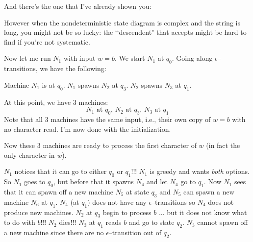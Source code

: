 And there's the one that I've already shown you:
\begin{center}
\end{center}


However when the nondeterministic state diagram is complex and the string is 
long, you might not be so lucky: the \lq\lq descendent"
that accepts
might be hard to find if you're not systematic.


Now let me run $N_1$ with input $w = b$. 
We start $N_1$ at $q_0$.
Going along $\epsilon$--transitions, we have the following:
\begin{enumerate}
\li Machine $N_1$ is at $q_0$. 
\li $N_1$ spawns $N_2$ at $q_3$. 
\li $N_2$ spawns $N_3$ at $q_1$.
\end{enumerate}
At this point, we have 3 machines:
\[
\text{$N_1$ at $q_0$, $N_2$ at $q_3$, $N_3$ at $q_1$}
\]
Note that all 3 machines have the same input, i.e., their own copy of 
$w = b$ with no character read.
I'm now done with the initialization.

Now these 3 machines are ready to process the first character of $w$ 
(in fact the only character in $w$).
\begin{enumerate}
  \li 
  $N_1$ notices that it can go to either $q_0$ or $q_1$!!! 
  $N_1$ is greedy and wants \textit{both} options.
  So $N_1$ goes to $q_0$, 
  but before that it spawns $N_4$ and let $N_4$ go to $q_1$. 
  Now $N_1$ sees that it can spawn off a new machine $N_5$ 
  at state $q_3$ and $N_5$ can spawn a new machine $N_6$ at $q_1$.
  $N_4$ (at $q_1$) does not have any $\epsilon$--transitions
  so $N_4$ does not produce new machines.
  \li $N_2$ at $q_3$ begin to process $b$ ... but it does not know what to do 
  with $b$!!! $N_2$ dies!!! 
  \li $N_3$ at $q_1$ reads $b$ and go to state $q_2$.
  $N_3$ 
  cannot spawn off a new machine since there are no $\epsilon$--transition
  out of $q_2$.
\end{enumerate}

